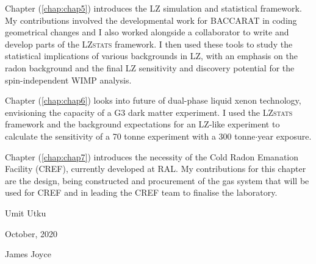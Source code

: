 \begin{declaration}
Chapter (\ref{chap:chap5}) introduces the LZ simulation and statistical framework. My contributions involved the developmental work for \textsc{BACCARAT} in coding geometrical changes and I also worked alongside a collaborator to write and develop parts of the \textsc{LZstats} framework. I then used these tools to study the statistical implications of various backgrounds in LZ, with an emphasis on the radon background and the final LZ sensitivity and discovery potential for the spin-independent WIMP analysis.
  
Chapter (\ref{chap:chap6}) looks into future of dual-phase liquid xenon technology, envisioning the capacity of a G3 dark matter experiment. I used the \textsc{LZstats} framework and the background expectations for an LZ-like experiment to calculate the sensitivity of a 70 tonne experiment with a 300 tonne$\cdot$year exposure.  
  
Chapter (\ref{chap:chap7}) introduces the necessity of the Cold Radon Emanation Facility (CREF), currently developed at RAL. My contributions for this chapter are the design, being constructed and procurement of the gas system that will be used for CREF and in leading the CREF team to finalise the laboratory.    
  
\vspace*{1cm}
\begin{flushright}
Umit Utku
\end{flushright}

\begin{flushright}
October, 2020
\end{flushright}

\end{declaration}


\tableofcontents


\listoffigures
\listoftables


%
  {James Joyce}
\thispagestyle{empty}
